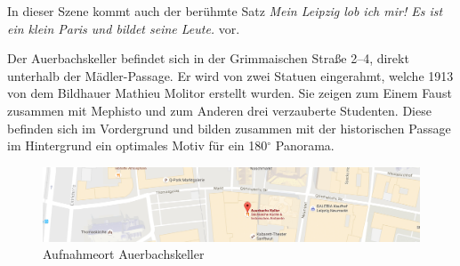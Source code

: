 \documentclass[liststotoc,bibtotoc,fontsize=14pt,]{scrreprt}
\begin{document}
	\bigskip
	In dieser Szene kommt auch der berühmte Satz \textit{\grqq{}Mein Leipzig lob ich mir! Es ist ein klein Paris und bildet seine Leute.\grqq{}} vor.
	
	\bigskip
	Der Auerbachskeller befindet sich in der Grimmaischen Straße 2–4, direkt unterhalb der Mädler-Passage. Er wird von zwei Statuen eingerahmt, welche 1913 von dem Bildhauer Mathieu Molitor erstellt wurden. Sie zeigen zum Einem Faust zusammen mit Mephisto und zum Anderen drei verzauberte Studenten. Diese befinden sich im Vordergrund und bilden zusammen mit der historischen Passage im Hintergrund ein optimales Motiv für ein 180$^\circ$ Panorama.
	
	\begin{figure}[H]
		\includegraphics[width=\linewidth]{img/places/ak_map.jpg}
		\caption{Aufnahmeort Auerbachskeller}
		\label{img:ak_map}
	\end{figure}
\end{document}
